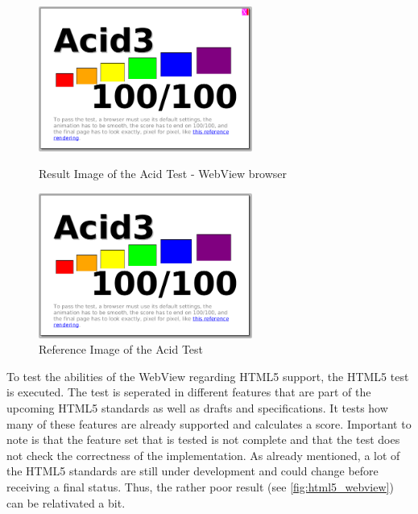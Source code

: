 \begin{figure}
\begin{minipage}[t]{7cm}
	\centering
	\includegraphics[width=7cm]{./img/tech-ana/acid_result_webView.png}
	\caption{Result Image of the Acid Test - WebView browser}
	\label{fig:acid_webview}
\end{minipage}
\hfill
\begin{minipage}[t]{7cm}
	\centering
	\includegraphics[width=7cm]{./img/tech-ana/acid_reference.png}
	\caption{Reference Image of the Acid Test}
	\label{fig:acid_reference}
\end{minipage}
\end{figure}


To test the abilities of the WebView regarding HTML5 support, the HTML5 test \autocite{tech-ana:html5-test} is executed.
The test is seperated in different features that are part of the upcoming HTML5 standards as well as drafts and specifications.
It tests how many of these features are already supported and calculates a score.
Important to note is that the feature set that is tested is not complete and that the test does not check the correctness of the implementation.
As already mentioned, a lot of the HTML5 standards are still under development and could change before receiving a final status.
Thus, the rather poor result (see \ref{fig:html5_webview}) can be relativated a bit.

